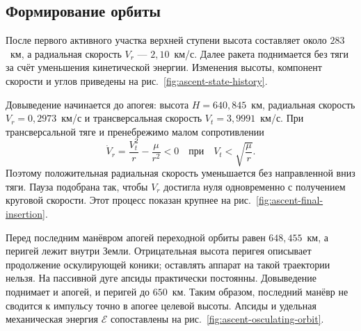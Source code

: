 
\subsection{Формирование орбиты}

После первого активного участка верхней ступени высота составляет
около $283$~км, а радиальная скорость $V_r$ --- $2{,}10$~км/с.
Далее ракета поднимается без тяги за счёт уменьшения
кинетической энергии. Изменения высоты, компонент скорости
и углов приведены на рис.~\ref{fig:ascent-state-history}.


Довыведение начинается до апогея: высота $H=640{,}845$~км,
радиальная скорость $V_r=0{,}2973$~км/с и трансверсальная
скорость $V_t=3{,}9991$~км/с.
При трансверсальной тяге и пренебрежимо малом сопротивлении
\begin{equation}
 \dot V_r=\frac{V_t^2}{r}-\frac{\mu}{r^2}<0
 \quad\text{при}\quad V_t<\sqrt{\frac{\mu}{r}}.
 \label{eq:numerical-radial-deceleration}
\end{equation}
Поэтому положительная радиальная скорость уменьшается без
направленной вниз тяги. Пауза подобрана так, чтобы $V_r$
достигла нуля одновременно с получением круговой скорости.
Этот процесс показан крупнее на рис.~\ref{fig:ascent-final-insertion}.


Перед последним манёвром апогей переходной орбиты равен
$648{,}455$~км, а перигей лежит внутри Земли.
Отрицательная высота перигея описывает продолжение оскулирующей
коники; оставлять аппарат на такой траектории нельзя.
На пассивной дуге апсиды практически постоянны.
Довыведение поднимает и апогей, и перигей до $650$~км.
Таким образом, последний манёвр не сводится к импульсу точно
в апогее целевой высоты.
Апсиды и удельная механическая энергия $\mathcal E$
сопоставлены на рис.~\ref{fig:ascent-osculating-orbit}.


